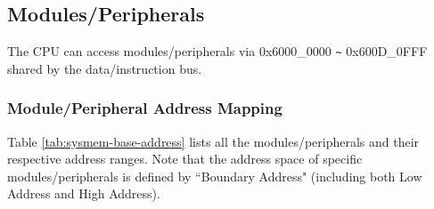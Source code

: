 \documentclass[main\_\_EN.tex]{subfiles}
\begin{document}
\subsection{Modules/Peripherals}

The CPU can access modules/peripherals via 0x6000\_0000 \verb+~+ 0x600D\_0FFF shared by the data/instruction bus.


\subsubsection{Module/Peripheral Address Mapping}

Table \ref{tab:sysmem-base-address} lists all the modules/peripherals and their respective address ranges. Note that the address space of specific modules/peripherals is defined by ``Boundary Address" (including both Low Address and High Address).


\end{document}
